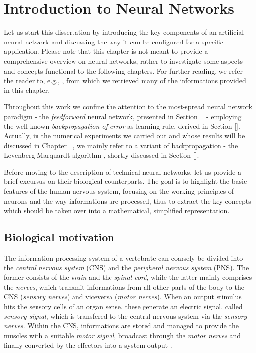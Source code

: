 \documentclass[11pt, a4paper]{report}
\numberwithin{equation}{chapter}
\theoremstyle{theorem}
\theoremstyle{definition}
\numberwithin{figure}{section}
\begin{document}
	\chapter{Introduction to Neural Networks}
	\label{chapter:Introduction to Neural Networks}
	
		Let us start this dissertation by introducing the key components of an artificial neural network and discussing the way it can be configured for a specific application. Please note that this chapter is not meant to provide a comprehensive overview on neural networks, rather to investigate some aspects and concepts functional to the following chapters. For further reading, we refer the reader to, e.g., \cite{Hag14, Hay05, Kri}, from which we retrieved many of the informations provided in this chapter.
		
		Throughout this work we confine the attention to the most-spread neural network paradigm - the \emph{feedforward} neural network, presented in Section \ref{} - employing the well-known \emph{backpropagation of error} as learning rule, derived in Section \ref{}. Actually, in the numerical experiments we carried out and whose results will be discussed in Chapter \ref{}, we mainly refer to a variant of backpropagation - the Levenberg-Marquardt algorithm \cite{}, shortly discussed in Section \ref{}. 
		
		Before moving to the description of technical neural networks, let us provide a brief excursus on their biological counterparts. The goal is to highlight the basic features of the human nervous system, focusing on the working principles of neurons and the way informations are processed, thus to extract the key concepts which should be taken over into a mathematical, simplified representation. 
		
	\section{Biological motivation}
	\label{section:Biological motivation} 
		
		The information processing system of a vertebrate can coarsely be divided into the \emph{central nervous system} (CNS) and the \emph{peripheral nervous system} (PNS). The former consists of the \emph{brain} and the \emph{spinal cord}, while the latter mainly comprises the \emph{nerves}, which transmit informations from all other parts of the body to the CNS (\emph{sensory nerves}) and viceversa (\emph{motor nerves}). When an output stimulus hits the sensory cells of an organ sense, these generate an electric signal, called \emph{sensory signal}, which is transfered to the central nervous system via the \emph{sensory nerves}. Within the CNS, informations are stored and managed to provide the muscles with a suitable \emph{motor signal}, broadcast through the \emph{motor nerves} and finally converted by the effectors into a system output \cite{Hay05}. %
		
\end{document}
